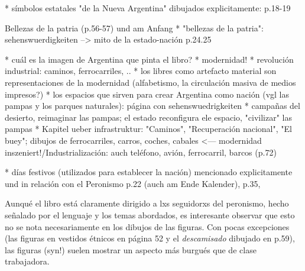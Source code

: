 * símbolos estatales "de la Nueva Argentina" dibujados explicitamente: p.18-19

Bellezas de la patria (p.56-57) und am Anfang
  * "bellezas de la patria": sehenswuerdigkeiten --> mito de la estado-nación p.24.25

* cuál es la imagen de Argentina que pinta el libro?
  * modernidad!
    * revolución industrial: caminos, ferrocarriles, ..
    * los libres como artefacto material son representaciones de la modernidad (alfabetismo, la circulación masiva de medios impresos?)
  * los espacios que sirven para crear Argentina como nación (vgl las pampas y los parques naturales): página con sehenswuedrigkeiten
    * campañas del desierto, reimaginar las pampas; el estado reconfigura ele espacio, "civilizar" las pampas
* Kapitel ueber infrastruktur: "Caminos", "Recuperación nacional", "El buey"; dibujos de ferrocarriles, carros, coches, cabales <--- modernidad inszeniert!/Industrialización: auch teléfono, avión, ferrocarril, barcos (p.72)

* días festivos (utilizados para establecer la nación) mencionado explicitamente und in relación con el Peronismo p.22 (auch am Ende Kalender), p.35, 


Aunqué el libro está claramente dirigido a lxs seguidorxs del peronismo,
hecho señalado por el lenguaje y los temas abordados,
es interesante observar que esto no se nota necesariamente en los dibujos de las figuras.
Con pocas excepciones (las figuras en vestidos étnicos en página 52 y el \textit{descamisado} dibujado en p.59),
las figuras (syn!) suelen mostrar un aspecto más burgués que de clase trabajadora.


\begin{comment}

* "Policlínico Evita" (p.43), "Fundación Eva Perón"(p.43), "clubes infantiles Evita" (donde se practica futbol^^)(p.55)
* se rescatan los éxitos (el voto femenino, el pago de las deudas,...)

* p.10: oraciones, rezar, catolicismo; pero también aquí "nunca olvido a Eva Perón, nuestra Madre Espiritual"
  * gottesgleichheit (hat anscheinend die kirche etwas verstoert^^ -- Chamosa o FF?)
  * kann alle wuensche verwirklichen
\end{comment}
